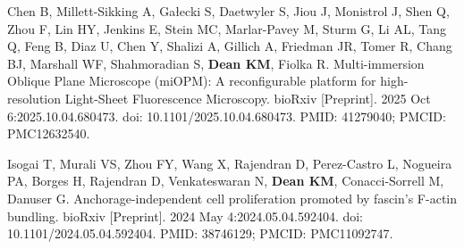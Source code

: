 \begin{etaremune}
\item Chen B, Millett-Sikking A, Ga\l{}ecki S, Daetwyler S, Jiou J, Monistrol J, Shen Q, Zhou F, Lin HY, Jenkins E, Stein MC, Marlar-Pavey M, Sturm G, Li AL, Tang Q, Feng B, Diaz U, Chen Y, Shalizi A, Gillich A, Friedman JR, Tomer R, Chang BJ, Marshall WF, Shahmoradian S, \textbf{Dean KM}, Fiolka R. Multi-immersion Oblique Plane Microscope (miOPM): A reconfigurable platform for high-resolution Light-Sheet Fluorescence Microscopy. bioRxiv [Preprint]. 2025 Oct 6:2025.10.04.680473. doi: 10.1101/2025.10.04.680473. PMID: 41279040; PMCID: PMC12632540.

\item Isogai T, Murali VS, Zhou FY, Wang X, Rajendran D, Perez-Castro L, Nogueira PA, Borges H, Rajendran D, Venkateswaran N, \textbf{Dean KM}, Conacci-Sorrell M, Danuser G. Anchorage-independent cell proliferation promoted by fascin's F-actin bundling. bioRxiv [Preprint]. 2024 May 4:2024.05.04.592404. doi: 10.1101/2024.05.04.592404. PMID: 38746129; PMCID: PMC11092747.

\end{etaremune}